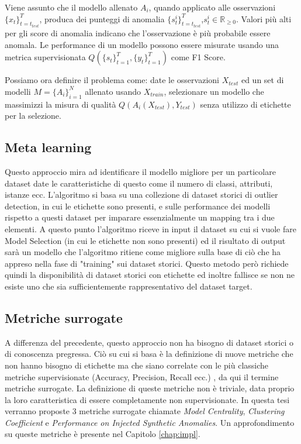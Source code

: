 Viene assunto che il modello allenato \(A_i\), quando applicato alle osservazioni \(\{x_t\}^{T}_{t=t_{test}}\), produca dei punteggi di anomalia \(\{s_t^i\}_{t=t_{test}}^T\),\(s^i_t\in\mathbb{R}_{\geq0}\). Valori più alti per gli score di anomalia indicano che l'osservazione è più probabile essere anomala.
Le performance di un modello possono essere misurate usando una metrica supervisionata \(Q(\{s_t\}^T_{t=1},\{y_t\}^T_{t=1})\) come F1 Score.

Possiamo ora definire il problema come: date le osservazioni \(X_{test}\) ed un set di modelli \(M=\{A_i\}^N_{i=1}\) allenato usando \(X_{train}\), selezionare un modello che massimizzi la misura di qualità \(Q(A_i(X_{test}),Y_{test})\) senza utilizzo di etichette per la selezione.

\subsection{Meta learning}
Questo approccio mira ad identificare il modello migliore per un particolare dataset date le caratteristiche di questo come il numero di classi, attributi, istanze ecc. L'algoritmo si basa su una collezione di dataset storici di outlier detection, in cui le etichette sono presenti, e sulle performance dei modelli rispetto a questi dataset per imparare essenzialmente un mapping tra i due elementi. 
A questo punto l'algoritmo riceve in input il dataset su cui si vuole fare Model Selection (in cui le etichette non sono presenti) ed il risultato di output sarà un modello che l'algoritmo ritiene come migliore sulla base di ciò che ha appreso nella fase di "training" sui dataset storici.
Questo metodo però richiede quindi la disponibilità di dataset storici con etichette ed inoltre fallisce se non ne esiste uno che sia sufficientemente rappresentativo del dataset target.
\subsection{Metriche surrogate}
A differenza del precedente, questo approccio non ha bisogno di dataset storici o di conoscenza pregressa. Ciò su cui si basa è la definizione di nuove metriche che non hanno bisogno di etichette ma che siano correlate con le più classiche metriche supervisionate (Accuracy, Precision, Recall ecc.) \cite{DBLP:journals/corr/abs-2104-01422}, da qui il termine metriche surrogate.
La definizione di queste metriche non è triviale, data proprio la loro caratteristica di essere completamente non supervisionate. In questa tesi verranno proposte 3 metriche surrogate chiamate \textit{Model Centrality}, \textit{Clustering Coefficient} e \textit{Performance on Injected Synthetic Anomalies}. Un approfondimento su queste metriche è presente nel Capitolo \ref{chap:impl}.


